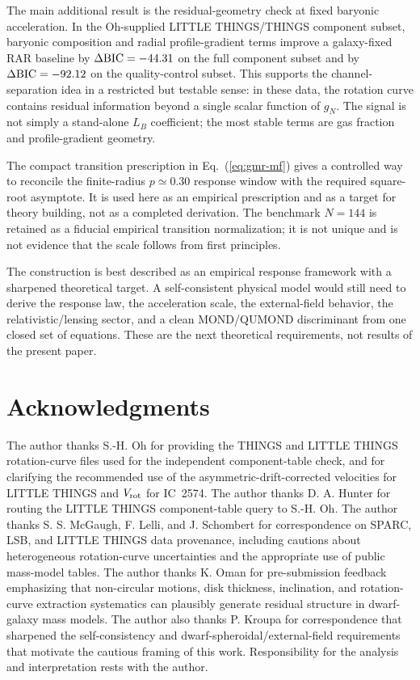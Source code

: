 ﻿\documentclass[twocolumn]{aastex631}
\begin{document}
The main additional result is the residual-geometry check at fixed baryonic acceleration.  In the Oh-supplied LITTLE THINGS/THINGS component subset, baryonic composition and radial profile-gradient terms improve a galaxy-fixed RAR baseline by $\Delta{\rm BIC}=-44.31$ on the full component subset and by $\Delta{\rm BIC}=-92.12$ on the quality-control subset.  This supports the channel-separation idea in a restricted but testable sense: in these data, the rotation curve contains residual information beyond a single scalar function of $g_N$.  The signal is not simply a stand-alone $L_B$ coefficient; the most stable terms are gas fraction and profile-gradient geometry.

The compact transition prescription in Eq.~(\ref{eq:gmr-mf}) gives a controlled way to reconcile the finite-radius $p\simeq0.30$ response window with the required square-root asymptote.  It is used here as an empirical prescription and as a target for theory building, not as a completed derivation.  The benchmark $N=144$ is retained as a fiducial empirical transition normalization; it is not unique and is not evidence that the scale follows from first principles.

The construction is best described as an empirical response framework with a sharpened theoretical target.  A self-consistent physical model would still need to derive the response law, the acceleration scale, the external-field behavior, the relativistic/lensing sector, and a clean MOND/QUMOND discriminant from one closed set of equations.  These are the next theoretical requirements, not results of the present paper.


\section*{Acknowledgments}
\noindent
The author thanks S.-H. Oh for providing the THINGS and LITTLE THINGS rotation-curve files used for the independent component-table check, and for clarifying the recommended use of the asymmetric-drift-corrected velocities for LITTLE THINGS and $V_{\rm rot}$ for IC~2574.  The author thanks D. A. Hunter for routing the LITTLE THINGS component-table query to S.-H. Oh.  The author thanks S. S. McGaugh, F. Lelli, and J. Schombert for correspondence on SPARC, LSB, and LITTLE THINGS data provenance, including cautions about heterogeneous rotation-curve uncertainties and the appropriate use of public mass-model tables.  The author thanks K. Oman for pre-submission feedback emphasizing that non-circular motions, disk thickness, inclination, and rotation-curve extraction systematics can plausibly generate residual structure in dwarf-galaxy mass models.  The author also thanks P. Kroupa for correspondence that sharpened the self-consistency and dwarf-spheroidal/external-field requirements that motivate the cautious framing of this work.  Responsibility for the analysis and interpretation rests with the author.
\end{document}
